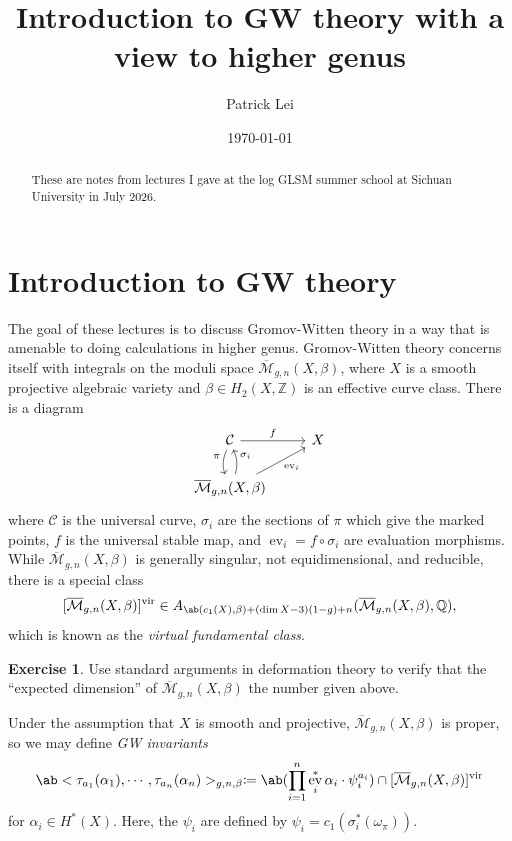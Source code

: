 \documentclass{amsart}
\title{Introduction to GW theory with a view to higher genus}
\author{Patrick Lei}
\date{\today}
\theoremstyle{definition}
\newtheorem{exer}[thm]{Exercise}
\theoremstyle{remark}
\theoremstyle{plain}
\theoremstyle{definition}
\theoremstyle{remark}
\newcommand{\Z}{\mathbb{Z}}
\newcommand{\Q}{\mathbb{Q}}
\newcommand{\Mbar}{\overline{\mathcal{M}}}
\newcommand{\mc}[1]{\mathcal{#1}}
\newcommand{\mr}[1]{\mathrm{#1}}
\newcommand{\on}[1]{\operatorname{#1}}
\newcommand{\1}{\mathbf{1}}
\newcommand{\2}{\mathbf{2}}
\newcommand{\3}{\mathbf{3}}
\newcommand{\vir}{\mr{vir}}
\DeclareMathOperator{\ev}{ev}
\begin{document}
    
\begin{abstract}
    These are notes from lectures I gave at the log GLSM summer school at Sichuan University in July 2026.
\end{abstract}

\maketitle

\tableofcontents

\section{Introduction to GW theory}%
\label{sec:Introduction to GW theory}

The goal of these lectures is to discuss Gromov-Witten theory in a way that is amenable to doing calculations in higher genus. Gromov-Witten theory concerns itself with integrals on the moduli space \(\Mbar_{g,n}(X, \beta)\), where \(X\) is a smooth projective algebraic variety and \(\beta \in H_2(X, \Z)\) is an effective curve class. There is a diagram
\begin{equation*}
\begin{tikzcd}
    \mc{C} \ar{r}{f} \ar[bend right=20]{d}[swap]{\pi} & X \\
    \Mbar_{g,n}(X, \beta) \ar[bend right=20]{u}[swap]{\sigma_i} \ar{ur}[swap]{\on{ev}_i}
\end{tikzcd}
\end{equation*}
where \(\mc{C}\) is the universal curve, \(\sigma_i\) are the sections of \(\pi\) which give the marked points, \(f\) is the universal stable map, and \(\ev_i = f \circ \sigma_i\) are evaluation morphisms. While \(\Mbar_{g,n}(X, \beta)\) is generally singular, not equidimensional, and reducible, there is a special class
\[ [\Mbar_{g,n}(X, \beta)]^{\vir} \in A_{\ab(c_1(X), \beta) + (\dim X - 3)(1-g) + n}(\Mbar_{g,n}(X, \beta), \Q), \]
which is known as the \textit{virtual fundamental class}. 

\begin{exer}
    Use standard arguments in deformation theory to verify that the ``expected dimension'' of \(\Mbar_{g,n}(X, \beta)\) the number given above.
\end{exer}

Under the assumption that \(X\) is smooth and projective, \(\Mbar_{g,n}(X, \beta)\) is proper, so we may define \textit{GW invariants}
\[ \ab<\tau_{a_1}(\alpha_1), \cdots, \tau_{a_n}(\alpha_n)>_{g,n,\beta} \coloneqq \ab(\prod_{i=1}^n \ev_i^* \alpha_i \cdot \psi_i^{a_i}) \cap [\Mbar_{g,n}(X, \beta)]^{\vir} \]
for \(\alpha_i \in H^*(X)\). Here, the \(\psi_i\) are defined by \(\psi_i = c_1(\sigma_i^*(\omega_{\pi}))\).
\end{document}
